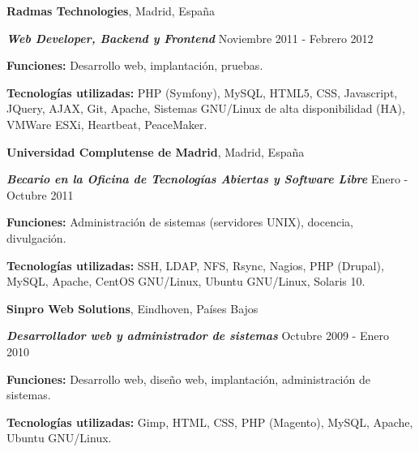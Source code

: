 \documentclass[margin,line]{resume}
\begin{document}
\begin{resume}
{\bf Radmas Technologies}, Madrid, España

\vspace{-.3cm}
{\bf \em Web Developer, Backend y Frontend} \hfill
{ Noviembre 2011 - Febrero 2012
}
\begin{list2}
\vspace*{.05in}
\item {\bf Funciones: }{Desarrollo web, implantación, pruebas.}
\item {\bf Tecnologías utilizadas: }{PHP (Symfony), MySQL, HTML5, CSS,
Javascript, JQuery, AJAX, Git, Apache, Sistemas GNU/Linux de alta
disponibilidad (HA), VMWare ESXi, Heartbeat, PeaceMaker.}
\end{list2}

{\bf Universidad Complutense de Madrid}, Madrid, España

\vspace{-.3cm}
{\bf \em Becario en la Oficina de Tecnologías Abiertas y Software Libre} \hfill
{ Enero - Octubre 2011
}
\begin{list2}
\vspace*{.05in}
\item {\bf Funciones: }{Administración de sistemas (servidores UNIX), 
    docencia, divulgación.}
\item {\bf Tecnologías utilizadas: }{SSH, LDAP, NFS, Rsync, Nagios, PHP
(Drupal), MySQL, Apache, CentOS GNU/Linux, Ubuntu GNU/Linux, Solaris 10.}
\end{list2}



{\bf Sinpro Web Solutions}, Eindhoven, Países Bajos

\vspace{-.3cm}
{\bf \em Desarrollador web y administrador de sistemas} \hfill { Octubre 2009 -
Enero 2010}
\begin{list2}
\vspace*{.05in}
\item {\bf Funciones: }{Desarrollo web, diseño web, implantación, administración de
sistemas.}
\item {\bf Tecnologías utilizadas: }{Gimp, HTML, CSS, PHP (Magento), MySQL,
Apache, Ubuntu GNU/Linux.}
\end{list2}


\end{resume}
\end{document}
